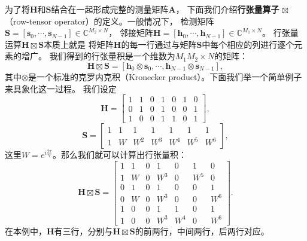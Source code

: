 \documentclass[AutoFakeBold]{LZUThesis}
\begin{document}
为了将$\mathbf{H}$和$\mathbf{S}$结合在一起形成完整的测量矩阵$\mathbf{A}$，
下面我们介绍\textbf{行张量算子} $\boxtimes$（row-tensor operator）的定义。一般情况下，
检测矩阵$\mathbf{S} = \left[\mathbf{s}_0, \cdots, \mathbf{s}_{N-1}\right] \in \mathbb{C}^{M_2 \times N}$，
邻接矩阵$\mathbf{H} = \left[\mathbf{h}_0, \cdots, \mathbf{h}_{N-1}\right] \in \mathbb{C}^{M_1 \times N}$。
行张量运算$\mathbf{H} \boxtimes \mathbf{S}$本质上就是
将矩阵$\mathbf{H}$的每一行通过与矩阵$\mathbf{S}$中每个相应的列进行逐个元素的增广。
我们得到的行张量积是一个维数为$M_1 M_2 \times N$的矩阵：
\begin{equation*}
    \mathbf{H} \boxtimes \mathbf{S} = \left[\mathbf{h}_0 \otimes \mathbf{s}_0 , \cdots , \mathbf{h}_{N-1} \otimes \mathbf{s}_{N-1} \right],
\end{equation*}
其中$\otimes$是一个标准的克罗内克积（Kronecker product）。下面我们举一个简单例子来具象化这一过程。
我们设定
\begin{equation}
    \mathbf{H} = 
    \left[
        \begin{array}{ccccccc}
            1 & 1 & 0 & 1 & 0 & 1 & 0 \\
            0 & 1 & 0 & 1 & 0 & 0 & 1 \\
            1 & 0 & 0 & 1 & 1 & 0 & 1
        \end{array}
    \right], 
\end{equation}
\begin{equation}
    \mathbf{S} = 
    \left[
        \begin{array}{ccccccc}
            1 & 1 & 1  & 1 & 1 & 1 & 1 \\
            1 & W & W^2 & W^3 & W^4 & W^5 & W^6
        \end{array}
    \right], 
\end{equation}
这里$W = e^{i \frac{2\pi}{7}}$。那么我们就可以计算出行张量积：
\begin{equation}
    \mathbf{H} \boxtimes \mathbf{S} = 
    \left[
        \begin{array}{ccccccc}
            1 & 1 & 0 & 1 & 0 & 1 & 0\\
            1 & W & 0 & W^3 & 0 & W^5 & 0\\
            0 & 1 & 0 & 1 & 0 & 0 & 1 \\
            0 & W & 0 & W^3 & 0 & 0 & W^6 \\
            1 & 0 & 0 & 1 & 1 & 0 & 1\\
            1 & 0 & 0 & W^3 & W^4 & 0 & W^6
        \end{array}
    \right].
\end{equation}
在本例中，$\mathbf{H}$有三行，分别与$\mathbf{H} \boxtimes \mathbf{S}$的前两行，中间两行，后两行对应。
\end{document}
